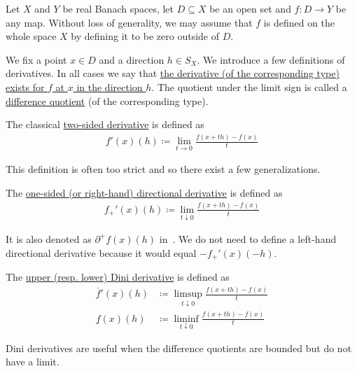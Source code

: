 Let $X$ and $Y$ be real Banach spaces, let $D \subseteq X$ be an open set and $f: D \to Y$ be any map. Without loss of generality, we may assume that $f$ is defined on the whole space $X$ by defining it to be zero outside of $D$.

\begin{definition}\label{def:banach_space_derivatives}
  We fix a point $x \in D$ and a direction $h \in S_X$. We introduce a few definitions of derivatives. In all cases we say that \uline{the derivative (of the corresponding type) exists for $f$ at $x$ in the direction $h$}. The quotient under the limit sign is called a \uline{difference quotient} (of the corresponding type).

  \begin{defenum}
    \item\label{def:banach_space_derivatives/classical} The classical \uline{two-sided derivative} is defined as
    \begin{align*}
      f'(x)(h) \coloneqq \lim_{t \to 0} \frac {f(x + th) - f(x)} t
    \end{align*}

    This definition is often too strict and so there exist a few generalizations.

    \item\label{def:banach_space_derivatives/onesided}\cite[lemma 1.2]{Phelps1993} The \uline{one-sided (or right-hand) directional derivative} is defined as
    \begin{align*}
      f_+'(x)(h) \coloneqq \lim_{t \downarrow 0} \frac {f(x + th) - f(x)} t
    \end{align*}

    It is also denoted as $\partial^+ f(x)(h)$ in~\cite[lemma 1.2]{Phelps1993}. We do not need to define a left-hand directional derivative because it would equal $-f_+'(x)(-h)$.

    \item\label{def:banach_space_derivatives/dini}\cite[definition 11.18]{Clarke2013} The \uline{upper (resp. lower) Dini derivative} is defined as
    \begin{align*}
      \overline f'(x)(h) &\coloneqq \limsup_{t \downarrow 0} \frac {f(x + th) - f(x)} t
      \\
      \underline f(x)(h) &\coloneqq \liminf_{t \downarrow 0} \frac {f(x + th) - f(x)} t
    \end{align*}

    Dini derivatives are useful when the difference quotients are bounded but do not have a limit.


\end{defenum}
\end{definition}
